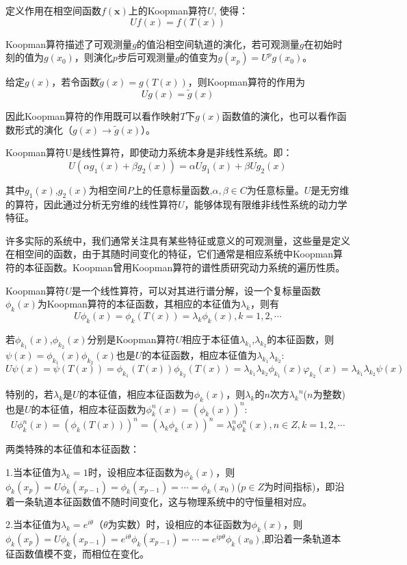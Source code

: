 定义作用在相空间函数$f(\mathbf{x})$上的Koopman算符$U$, 使得：
$$Uf\left( x\right)=f\left(T\left( x\right)\right)$$

Koopman算符描述了可观测量$g$的值沿相空间轨道的演化，若可观测量$g$在初始时刻的值为$g(x_0)$，则演化$p$步后可观测量$g$的值变为$g(x_p)=U^pg(x_0)$。

给定$g(x)$，若令函数$\tilde{g}(x)=g(T(x))$，则Koopman算符的作用为
$$Ug(x)=\tilde{g}(x)$$

因此Koopman算符的作用既可以看作映射$T$下$g(x)$函数值的演化，也可以看作函数形式的演化（$g(x)\rightarrow\tilde{g}(x)$）。

Koopman算符U是线性算符，即使动力系统本身是非线性系统。即：
                $$U(\alpha g_1(x)+\beta g_2(x))=\alpha Ug_1(x)+\beta Ug_2(x)$$

其中$g_1(x)$,$g_2(x)$为相空间$P$上的任意标量函数,$α,β\in C$为任意标量。$U$是无穷维的算符，因此通过分析无穷维的线性算符$U$，能够体现有限维非线性系统的动力学特征。

许多实际的系统中，我们通常关注具有某些特征或意义的可观测量，这些量是定义在相空间的函数，由于其随时间变化的特征，它们通常是相应系统中Koopman算符的本征函数。Koopman曾用Koopman算符的谱性质研究动力系统的遍历性质。

Koopman算符$U$是一个线性算符，可以对其进行谱分解，设一个复标量函数$\phi_k(x)$为Koopman算符的本征函数，其相应的本征值为$\lambda_k$，则有
$$U\phi_k(x)=\phi_k(T(x))=\lambda_k\phi_k(x), k=1,2,\cdots$$

若$\phi_{k_1}(x)$,$\phi_{k_2}(x)$分别是Koopman算符$U$相应于本征值$\lambda_{k_1}$,$\lambda_{k_2}$的本征函数，则$\psi(x)=\phi_{k_1}(x)\phi_{k_2}(x)$也是$U$的本征函数，相应本征值为$λ_{k_1}λ_{k_2}$: 
$$U\psi(x)=\psi(T(x))=\phi_{k_1}(T(x))\phi_{k_2}(T(x))=\lambda_{k_1}\lambda_{k_2}\phi_{k_1}(x)φ_{k_2}(x)=\lambda_{k_1}\lambda_{k_2}\psi(x)$$

特别的，若$\lambda_k$是$U$的本征值，相应本征函数为$\phi_k(x)$，则$\lambda_k$的$n$次方${\lambda_k}^n$($n$为整数)也是$U$的本征值，相应本征函数为$\phi_k^n(x)=(\phi_k(x))^n$:
      $$U\phi_k^n(x)=(\phi_k(T(x)))^n=(\lambda_k\phi_k(x))^n=λ_k^n\phi_k^n(x), n\in Z, k=1,2,\cdots$$

两类特殊的本征值和本征函数：

1.当本征值为$\lambda_k=1$时，设相应本征函数为$\phi_k(x)$，则$\phi_k(x_p)=U\phi_k(x_{p-1})=\phi_k (x_{p-1})=\cdots =\phi_k(x_0)$($p\in Z$为时间指标)，即沿着一条轨道本征函数值不随时间变化，这与物理系统中的守恒量相对应。

2.当本征值为$\lambda_k=e^{i\theta}$（$\theta$为实数）时，设相应的本征函数为$\phi_k(x)$，则$\phi_k(x_p)=U\phi_k(x_{p-1})=e^{i\theta}\phi_k(x_{p-1})=\cdots=e^{ip\theta}\phi_k(x_0)$,即沿着一条轨道本征函数值模不变，而相位在变化。

